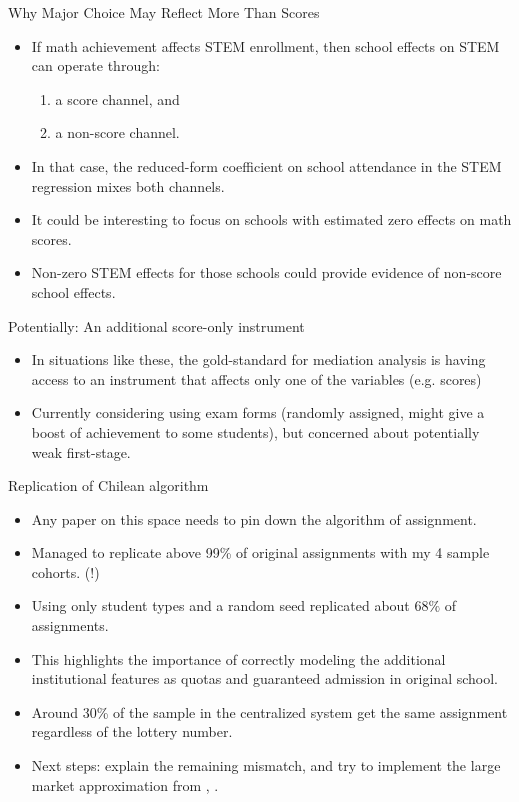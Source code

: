 \documentclass[notes,11pt, aspectratio=169]{beamer}
\begin{document}
\begin{frame}{Why Major Choice May Reflect More Than Scores}
\begin{itemize}

    
    \item If math achievement affects STEM enrollment, then school effects on STEM can operate through:
    \begin{enumerate}
        \item a score channel, and
        \item a non-score channel.
    \end{enumerate}
    \item In that case, the reduced-form coefficient on school attendance in the STEM regression mixes both channels.
    \item It could be interesting to focus on schools with estimated zero effects on math scores.
    \item Non-zero STEM effects for those schools could provide evidence of non-score school effects.
\end{itemize}
\end{frame}

\begin{frame}{Potentially: An additional score-only instrument}

\begin{itemize}
    \item In situations like these, the gold-standard for mediation analysis is having access to an instrument that affects only one of the variables (e.g. scores) 
    \item Currently considering using exam forms (randomly assigned, might give a boost of achievement to some students), but concerned about potentially weak first-stage. 

\end{itemize}
    
\end{frame}

 \begin{frame}{Replication of Chilean algorithm}
\begin{itemize}
    \item Any paper on this space needs to pin down the algorithm of assignment.
    \item Managed to replicate above 99\% of original assignments with my 4 sample cohorts. (!) 
    \item Using only student types and a random seed replicated about \(68\%\) of assignments.   
    \item This highlights the importance of correctly modeling the additional institutional features as quotas and guaranteed admission in original school.
    \item Around 30\% of the sample in the centralized system get the same assignment regardless of the lottery number.  
    \item Next steps: explain the remaining mismatch, and try to implement the large market approximation from \textcite{abdulkadiroglu_breaking_2022}, \textcite{abdulkadiroglu_research_2017}.  
\end{itemize}
\end{frame}
\end{document}
